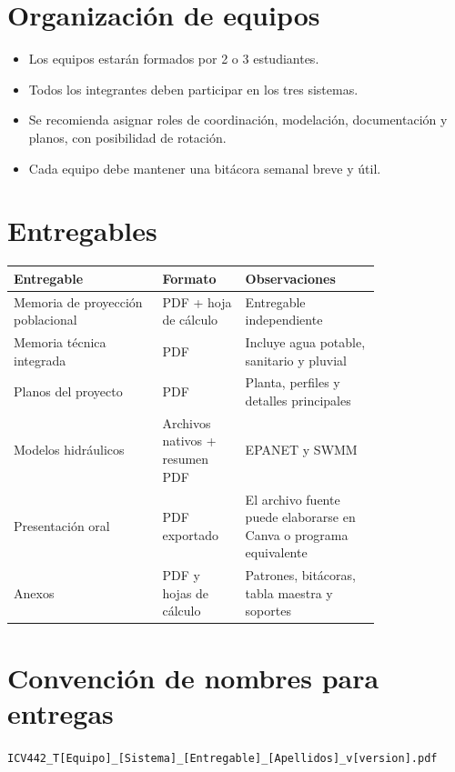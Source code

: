 \documentclass[11pt]{article}
\begin{document}
\section{Organizaci\'on de equipos}
\begin{itemize}
\item Los equipos estar\'an formados por 2 o 3 estudiantes.
\item Todos los integrantes deben participar en los tres sistemas.
\item Se recomienda asignar roles de coordinaci\'on, modelaci\'on, documentaci\'on y planos, con posibilidad de rotaci\'on.
\item Cada equipo debe mantener una bit\'acora semanal breve y \'util.
\end{itemize}

\section{Entregables}
\begin{center}
\begin{tabular}{p{0.33\linewidth} p{0.17\linewidth} p{0.30\linewidth}}
\toprule
\textbf{Entregable} & \textbf{Formato} & \textbf{Observaciones} \\
\midrule
Memoria de proyecci\'on poblacional & PDF + hoja de c\'alculo & Entregable independiente \\
Memoria t\'ecnica integrada & PDF & Incluye agua potable, sanitario y pluvial \\
Planos del proyecto & PDF & Planta, perfiles y detalles principales \\
Modelos hidr\'aulicos & Archivos nativos + resumen PDF & EPANET y SWMM \\
Presentaci\'on oral & PDF exportado & El archivo fuente puede elaborarse en Canva o programa equivalente \\
Anexos & PDF y hojas de c\'alculo & Patrones, bit\'acoras, tabla maestra y soportes \\
\bottomrule
\end{tabular}
\end{center}

\section{Convenci\'on de nombres para entregas}
\begin{infobox}
\texttt{ICV442\_T[Equipo]\_[Sistema]\_[Entregable]\_[Apellidos]\_v[version].pdf}
\end{infobox}
\end{document}
